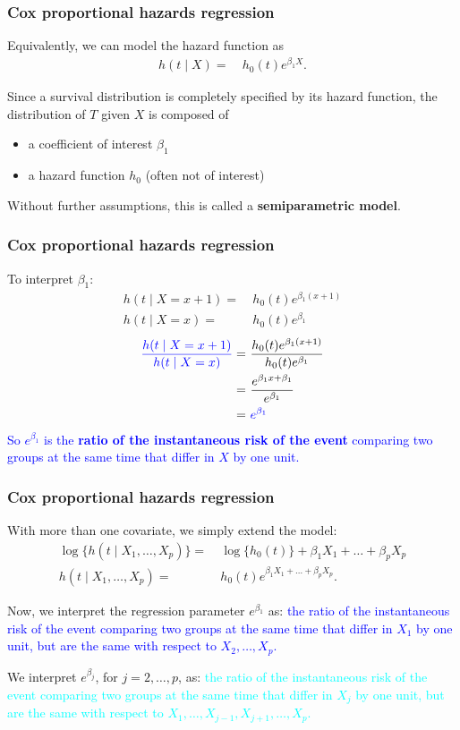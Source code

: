\documentclass[12pt, 
hyperref={colorlinks=true, linkcolor=blue, urlcolor=cyan},dvipsnames]{beamer}
\begin{document}
\begin{frame}
\frametitle{Cox proportional hazards regression}
Equivalently, we can model the hazard function as
\begin{align*}
h(t \mid X) = & \ h_0(t)e^{\beta_1 X}.
\end{align*}

Since a survival distribution is completely specified by its hazard function, the distribution of $T$ given $X$ is composed of
\begin{itemize}
\item a coefficient of interest $\beta_1$ 
\item a hazard function $h_0$ (often not of interest)
\end{itemize}
Without further assumptions, this is called a \textbf{semiparametric model}.
\end{frame}

\begin{frame}
\frametitle{Cox proportional hazards regression}
To interpret $\beta_1$: 
\begin{align*}
h(t \mid X = x + 1) = & \ h_0(t)e^{\beta_1 (x + 1)}\\
h(t \mid X = x) = & \ h_0(t)e^{\beta_1} 
\end{align*}\pause
\begin{align*}
\textcolor{blue}{\frac{h(t \mid X = x + 1)}{h(t \mid X = x)}} = & \ \frac{h_0(t)e^{\beta_1 (x + 1)}}{h_0(t)e^{\beta_1}} \\
=& \ \frac{e^{\beta_1x + \beta_1}}{e^{\beta_1}} \\
=& \ \textcolor{blue}{e^{\beta_1}}
\end{align*}
\textcolor{blue}{So $e^{\beta_1}$ is the \textbf{ratio of the instantaneous risk of the event} comparing two groups at the same time that differ in $X$ by one unit.}
\end{frame}

\begin{frame}
\frametitle{Cox proportional hazards regression}
With more than one covariate, we simply extend the model:
\begin{align*}
\log \{h(t \mid X_1, \dots, X_p)\} = & \ \log\{h_0(t)\} + \beta_1 X_1 + \dots + \beta_pX_p \\
h(t \mid X_1, \dots, X_p) = & \ h_0(t)e^{\beta_1X_1 + \dots + \beta_pX_p}.
\end{align*}

Now, we interpret the regression parameter $e^{\beta_1}$ as: \pause \textcolor{blue}{the ratio of the instantaneous risk of the event comparing two groups at the same time that differ in $X_1$ by one unit, but are the same with respect to $X_2, \dots, X_p$.}

We interpret $e^{\beta_j}$, for $j = 2, \dots, p$, as: \pause
\textcolor{cyan}{the ratio of the instantaneous risk of the event comparing two groups at the same time that differ in $X_j$ by one unit, but are the same with respect to $X_1, \dots, X_{j-1}, X_{j+1}, \dots, X_p$.}
\end{frame}
\end{document}
